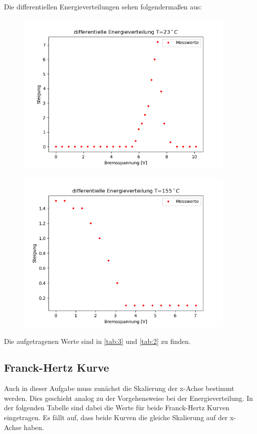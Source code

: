 \noindent Die differentiellen Energieverteilungen sehen folgendermaßen aus:

\begin{figure}[H]
    \centering
    \includegraphics[height=8cm]{"8a1.png"}
\end{figure}

\begin{figure}[H]
    \centering
    \includegraphics[height=8cm]{"8a2.png"}
\end{figure}

\noindent Die aufgetragenen Werte sind in \ref{tab:3} und \ref{tab:2} zu finden.

\subsection{Franck-Hertz Kurve}

Auch in dieser Aufgabe muss zunächst die Skalierung der x-Achse bestimmt werden.
Dies geschieht analog zu der Vorgehensweise bei der Energieverteilung. In der folgenden Tabelle sind dabei die Werte für beide Franck-Hertz Kurven eingetragen. Es fällt auf, dass beide Kurven die gleiche Skalierung auf der x-Achse haben.


